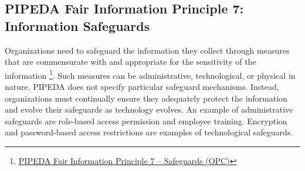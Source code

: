 \subsection*{PIPEDA Fair Information Principle 7: Information Safeguards}

Organizations need to safeguard the information they collect through measures that are commensurate with and appropriate for the sensitivity of the information \footnote{\href{https://www.priv.gc.ca/en/privacy-topics/privacy-laws-in-canada/the-personal-information-protection-and-electronic-documents-act-pipeda/p_principle/principles/p_safeguards/}{PIPEDA Fair Information Principle 7 -- Safeguards (OPC)}}. Such measures can be administrative, technological, or physical in nature. PIPEDA does not specify particular safeguard mechanisms. Instead, organizations must continually ensure they adequately protect the information and evolve their safeguards as technology evolves. An example of administrative safeguards are role-based access permission and employee training. Encryption and password-based access restrictions are examples of technological safeguards. 

